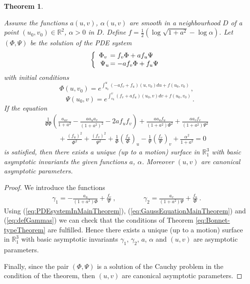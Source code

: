 \documentclass[12pt]{amsart}
\newtheorem{thm}{Theorem}[section]
\theoremstyle{definition}
\theoremstyle{remark}
\newcommand{\ds}{\displaystyle}
\begin{document}
\begin{thm} \label{eq:MainTheoremByAlphaAndA}

Assume the functions $a(u,v)$, $\alpha(u,v)$ are smooth in a neighbourhood 
$ D $ of a point $(u_0,v_0) \in \mathbb R^2$, $\alpha>0$ in $ D $. 
Define $f=\frac12 \left( \log\sqrt{1+a^2}-\log\alpha \right)$.
Let $(\Phi,\Psi)$ be the solution of the  PDE system
\begin{equation} \label{eq:PDEsystemInMainTheorem}
	\left\{\begin{array}{rl}
	 \Phi_v \hspace{-0.2cm}    &  \ds =f_v\Phi +af_u\Psi  \\
	 \Psi_u  \hspace{-0.3cm} &  \ds =-af_v\Phi +f_u\Psi
	\end{array}\right.
\end{equation}
with initial conditions 
$$
	\Phi(u,v_0)=e^{\ds\int_{u_0}^u\left(-af_v+f_u\right)(u,v_0)du +f(u_0,v_0)} \,,
$$
$$
	\quad  \Psi(u_0,v)=e^{\ds\int_{v_0}^v\left(f_v+af_u\right)(u_0,v)dv +f(u_0,v_0)} \,.
$$
If the equation
\begin{equation} \label{eq:GaussEquationMainTheorem}
	\begin{array}{l}
		\ds \frac1{\Phi\Psi}\left(\frac{a_{uv}}{1+a^2}-\frac{aa_ua_v}{(1+a^2)^2} -2af_uf_v \right)
				+ \frac{  aa_uf_u}{(1+a^2)\Phi^2}	   +\frac{  aa_vf_v}{(1+a^2)\Psi^2 } \\
		\ds	\qquad + \frac{(f_u)^2}{\Phi^2}+\frac{(f_v)^2}{\Psi^2} 
				+ \frac1{\Phi}\left(\frac{f_u}{\Phi}\right)_u -\frac1{\Psi}\left(\frac{f_v}{\Psi}\right)_v 
				+\frac{\alpha^2}{1+a^2}=0  
	\end{array}
\end{equation}
is satisfied, then there exists a unique (up to a motion) surface in $\mathbb R^3_1$ with basic 
asymptotic invariants the given functions $a$, $\alpha$.
Moreover $(u,v)$ are canonical asymptotic parameters.
\end{thm}

\begin{proof}
We introduce the functions
\begin{equation} \label{eq:defGammas}
	\begin{array}{l}
		\ds\gamma_1=-\frac{a_u}{(1+a^2)\Phi}+\frac{f_v}{\Psi}  \ ,  \qquad\qquad
		\ds\gamma_2=\frac{a_v}{(1+a^2)\Psi}+\frac{f_u}{\Phi}  \ . 
	\end{array}
\end{equation}
Using (\ref{eq:PDEsystemInMainTheorem}), (\ref{eq:GaussEquationMainTheorem}) and (\ref{eq:defGammas}) 
we can check that the conditions of Theorem \ref{eq:Bonnet-typeTheorem} are fulfilled. 
Hence there exists
a unique (up to a motion) surface in $\mathbb R^3_1$ with basic 
asymptotic invariants  $\gamma_1$, $\gamma_2$, $a$, $\alpha$ and $(u,v)$ are asymptotic parameters.

Finally, since the pair $(\Phi,\Psi)$ is a solution
of the Cauchy problem in the condition of the theorem, 
then $(u,v)$ are canonical asymptotic parameters. 

\end{proof}
\end{document}
